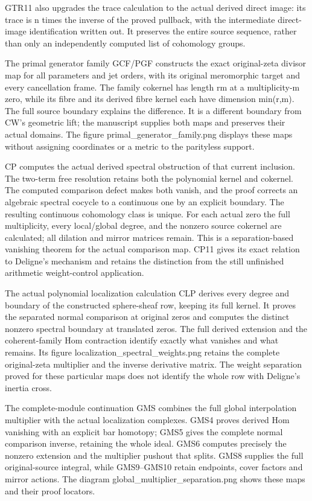 \documentclass[
]{report}
\begin{document}
GTR11 also upgrades the trace calculation to the actual derived direct
image: its trace is n times the inverse of the proved pullback, with the
intermediate direct-image identification written out. It preserves the
entire source sequence, rather than only an independently computed list
of cohomology groups.

The primal generator family GCF/PGF constructs the exact original-zeta
divisor map for all parameters and jet orders, with its original
meromorphic target and every cancellation frame. The family cokernel has
length rm at a multiplicity-m zero, while its fibre and its derived
fibre kernel each have dimension min(r,m). The full source boundary
explains the difference. It is a different boundary from CW's geometric
lift; the manuscript supplies both maps and preserves their actual
domains. The figure primal\_generator\_family.png displays these maps
without assigning coordinates or a metric to the parityless support.

CP computes the actual derived spectral obstruction of that current
inclusion. The two-term free resolution retains both the polynomial
kernel and cokernel. The computed comparison defect makes both vanish,
and the proof corrects an algebraic spectral cocycle to a continuous one
by an explicit boundary. The resulting continuous cohomology class is
unique. For each actual zero the full multiplicity, every local/global
degree, and the nonzero source cokernel are calculated; all dilation and
mirror matrices remain. This is a separation-based vanishing theorem for
the actual comparison map. CP11 gives its exact relation to Deligne's
mechanism and retains the distinction from the still unfinished
arithmetic weight-control application.

The actual polynomial localization calculation CLP derives every degree
and boundary of the constructed sphere-sheaf row, keeping its full
kernel. It proves the separated normal comparison at original zeros and
computes the distinct nonzero spectral boundary at translated zeros. The
full derived extension and the coherent-family Hom contraction identify
exactly what vanishes and what remains. Its figure
localization\_spectral\_weights.png retains the complete original-zeta
multiplier and the inverse derivative matrix. The weight separation
proved for these particular maps does not identify the whole row with
Deligne's inertia cross.

The complete-module continuation GMS combines the full global
interpolation multiplier with the actual localization complexes. GMS4
proves derived Hom vanishing with an explicit bar homotopy; GMS5 gives
the complete normal comparison inverse, retaining the whole ideal. GMS6
computes precisely the nonzero extension and the multiplier pushout that
splits. GMS8 supplies the full original-source integral, while
GMS9--GMS10 retain endpoints, cover factors and mirror actions. The
diagram global\_multiplier\_separation.png shows these maps and their
proof locators.
\end{document}
